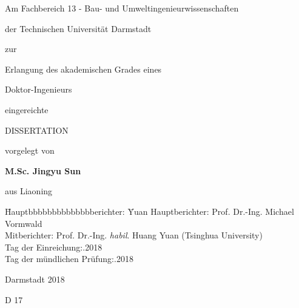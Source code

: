 %

\begin{titlepage}                  %
\renewcommand{\baselinestretch}{1.0}
\begin{center}

    {\bf\huge{} \par}
    {\bf\huge{} \par}
    {\bf\huge{} \par}

\vspace*{20mm}
    {{Am Fachbereich 13 - Bau- und Umweltingenieurwissenschaften\par}}
    {{der Technischen Universit\"{a}t Darmstadt \par}}


\vspace*{10mm}
    {{zur \par}}
    {{Erlangung des akademischen Grades eines \par}}
    {{Doktor-Ingenieurs \par}}


\vspace*{10mm}
    {{eingereichte} \par}
    {{DISSERTATION} \par}


\vspace*{25mm}
    {{vorgelegt von} \par}
\vspace*{2mm}
    {{\large \bf M.Sc. Jingyu Sun} \par}
\vspace*{2mm}
    {{aus Liaoning \par}}


\vspace*{25mm}
{
\begin{tabbing}
\hspace*{10mm}
\=Hauptbbbbbbbbbbbbbberichter: \=Yuan\kill
\>Hauptberichter: \> Prof. Dr.-Ing. Michael Vormwald\\
\>Mitberichter: \> Prof. Dr.-Ing. \emph{habil}. Huang Yuan (Tsinghua University)\\
\>Tag der Einreichung:.2018\\
\>Tag der m\"{u}ndlichen Pr\"{u}fung:.2018\\
\end{tabbing}
}

\vspace*{10mm}
	{{Darmstadt 2018} \par}
    {{D 17} \par}



\end{center}

\end{titlepage}
